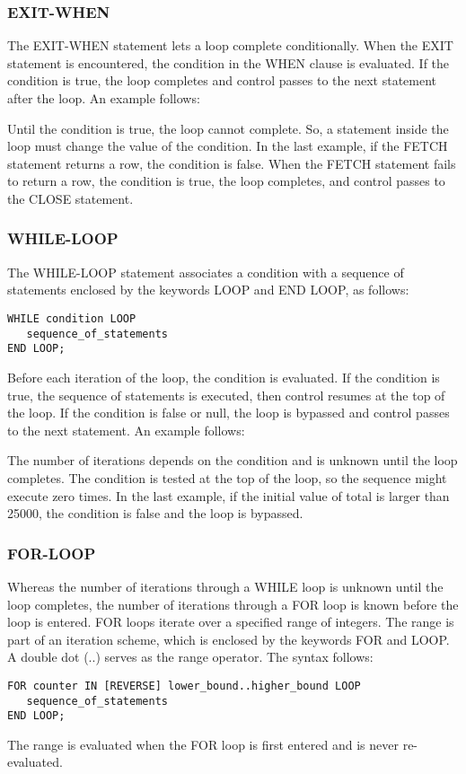\subsubsection{EXIT-WHEN}
The EXIT-WHEN statement lets a loop complete conditionally. When the EXIT statement is encountered, the condition in the WHEN clause is evaluated. If the condition is true, the loop completes and control passes to the next statement after the loop. An example follows:

Until the condition is true, the loop cannot complete. So, a statement inside the loop must change the value of the condition. In the last example, if the FETCH statement returns a row, the condition is false. When the FETCH statement fails to return a row, the condition is true, the loop completes, and control passes to the CLOSE statement.

\subsubsection{WHILE-LOOP}
The WHILE-LOOP statement associates a condition with a sequence of statements enclosed by the keywords LOOP and END LOOP, as follows:
\begin{verbatim}
WHILE condition LOOP
   sequence_of_statements
END LOOP;
\end{verbatim}
Before each iteration of the loop, the condition is evaluated. If the condition is true, the sequence of statements is executed, then control resumes at the top of the loop. If the condition is false or null, the loop is bypassed and control passes to the next statement. An example follows:

The number of iterations depends on the condition and is unknown until the loop completes. The condition is tested at the top of the loop, so the sequence might execute zero times. In the last example, if the initial value of total is larger than 25000, the condition is false and the loop is bypassed.

\subsubsection{FOR-LOOP}
Whereas the number of iterations through a WHILE loop is unknown until the loop completes, the number of iterations through a FOR loop is known before the loop is entered. FOR loops iterate over a specified range of integers. The range is part of an iteration scheme, which is enclosed by the keywords FOR and LOOP. A double dot (..) serves as the range operator. The syntax follows:
\begin{verbatim}
FOR counter IN [REVERSE] lower_bound..higher_bound LOOP
   sequence_of_statements
END LOOP;
\end{verbatim}
The range is evaluated when the FOR loop is first entered and is never re-evaluated.

